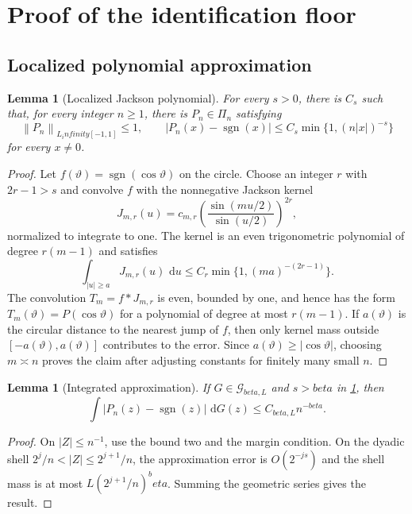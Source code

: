 \documentclass[11pt]{article}
\def\beta{beta}%
\def\infty{infinity}%
\newtheorem{lemma}[theorem]{Lemma}
\newcommand{\sgn}{\operatorname{sgn}}
\newcommand{\calG}{\mathcal G}
\newcommand{\norm}[1]{\left\lVert#1\right\rVert}
\newcommand{\dd}{\,\mathrm d}
\begin{document}
\section{Proof of the identification floor}
\label{app:identification}

\subsection{Localized polynomial approximation}

\begin{lemma}[Localized Jackson polynomial]
\label{lem:jackson}
For every $s>0$, there is $C_s$ such that, for every integer $n\ge1$, there is $P_n\in\Pi_n$ satisfying
\[
\norm{P_n}_{L_\infty[-1,1]}\le1,
\qquad
|P_n(x)-\sgn(x)|
\le
C_s\min\{1,(n|x|)^{-s}\}
\]
for every $x\ne0$.
\end{lemma}

\begin{proof}
Let $f(\vartheta)=\sgn(\cos\vartheta)$ on the circle.  Choose an integer $r$ with $2r-1>s$ and convolve $f$ with the nonnegative Jackson kernel
\[
J_{m,r}(u)
=c_{m,r}
\left(\frac{\sin(mu/2)}{\sin(u/2)}\right)^{2r},
\]
normalized to integrate to one.  The kernel is an even trigonometric polynomial of degree $r(m-1)$ and satisfies
\[
\int_{|u|\ge a}J_{m,r}(u)\,\dd u
\le
C_r\min\{1,(ma)^{-(2r-1)}\}.
\]
The convolution $T_m=f*J_{m,r}$ is even, bounded by one, and hence has the form $T_m(\vartheta)=P(\cos\vartheta)$ for a polynomial of degree at most $r(m-1)$.  If $a(\vartheta)$ is the circular distance to the nearest jump of $f$, then only kernel mass outside $[-a(\vartheta),a(\vartheta)]$ contributes to the error.  Since $a(\vartheta)\ge|\cos\vartheta|$, choosing $m\asymp n$ proves the claim after adjusting constants for finitely many small $n$.
\end{proof}

\begin{lemma}[Integrated approximation]
\label{lem:integrated-approx-paper}
If $G\in\calG_{\beta,L}$ and $s>\beta$ in \cref{lem:jackson}, then
\[
\int|P_n(z)-\sgn(z)|\,\dd G(z)
\le C_{\beta,L}n^{-\beta}.
\]
\end{lemma}

\begin{proof}
On $|Z|\le n^{-1}$, use the bound two and the margin condition.  On the dyadic shell $2^j/n<|Z|\le2^{j+1}/n$, the approximation error is $O(2^{-js})$ and the shell mass is at most $L(2^{j+1}/n)^\beta$.  Summing the geometric series gives the result.
\end{proof}
\end{document}
